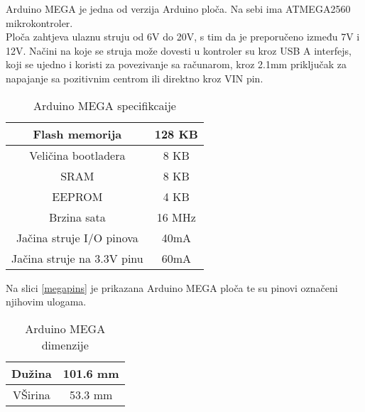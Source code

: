 \documentclass[../Document.tex]{subfiles}
\begin{document}
Arduino MEGA je jedna od verzija Arduino ploča. Na sebi ima ATMEGA2560 mikrokontroler.\\

Ploča zahtjeva ulaznu struju od 6V do 20V, s tim da je preporučeno između 7V i 12V. Načini na koje se struja može dovesti u kontroler su kroz USB A interfejs, koji se ujedno i koristi za povezivanje sa računarom, kroz 2.1mm priključak za napajanje sa pozitivnim centrom ili direktno kroz VIN pin.

\begin{table}[h]
  \centering
  \begin{tabular}{ |c|c| }
    \hline
    Flash memorija             & 128 KB \\
    \hline
    Veličina bootladera        & 8 KB   \\
    \hline
    SRAM                       & 8 KB   \\
    \hline
    EEPROM                     & 4 KB   \\
    \hline
    Brzina sata                & 16 MHz \\
    \hline
    Jačina struje I/O pinova   & 40mA   \\
    \hline
    Jačina struje na 3.3V pinu & 60mA   \\
    \hline
  \end{tabular}
  \caption{Arduino MEGA specifikcaije}
\end{table}

\noindent Na slici \ref{megapins} je prikazana Arduino MEGA ploča te su pinovi označeni njihovim ulogama.


\begin{table}[h!]
  \centering
  \begin{tabular}{ |c|c| }
    \hline
    Dužina  & 101.6 mm \\
    \hline
    VŠirina & 53.3 mm  \\
    \hline
  \end{tabular}
  \caption{Arduino MEGA dimenzije}
\end{table}
\end{document}
